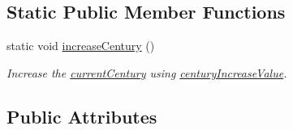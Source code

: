 \subsection*{Static Public Member Functions}
\begin{DoxyCompactItemize}
\item 
static void \mbox{\hyperlink{classtime_a35f54f331571b5bc8135f586045d753e}{increase\+Century}} ()
\begin{DoxyCompactList}\small\item\em Increase the \mbox{\hyperlink{classtime_acab6780ebb25862cb83316cb967b8b57}{current\+Century}} using \mbox{\hyperlink{classtime_af12b7ed0d7ff922e00ecb46dabdaede6}{century\+Increase\+Value}}. \end{DoxyCompactList}\end{DoxyCompactItemize}
\subsection*{Public Attributes}
